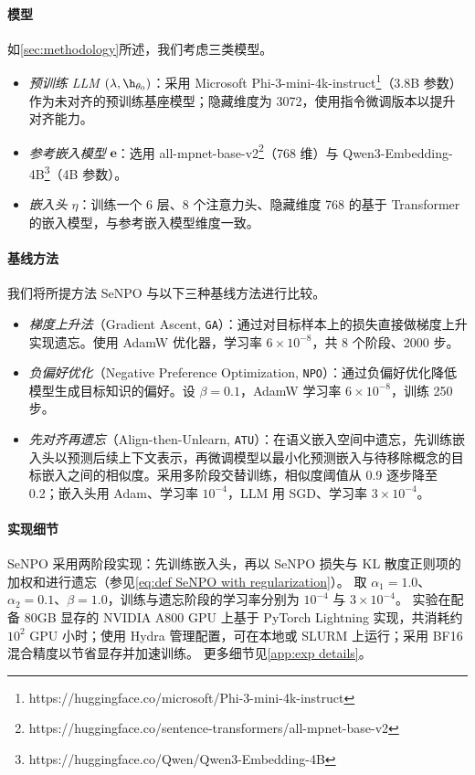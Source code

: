 \paragraph{模型}
如\ref{sec:methodology}所述，我们考虑三类模型。
\begin{itemize}
    \item \textit{预训练 LLM} $(\lambda, \h_{\theta_0})$：采用 Microsoft Phi-3-mini-4k-instruct\footnote{https://huggingface.co/microsoft/Phi-3-mini-4k-instruct}（3.8B 参数）作为未对齐的预训练基座模型；隐藏维度为 3072，使用指令微调版本以提升对齐能力。
    \item \textit{参考嵌入模型} $\boldsymbol{e}$：选用 all-mpnet-base-v2\footnote{https://huggingface.co/sentence-transformers/all-mpnet-base-v2}（768 维）与 Qwen3-Embedding-4B\footnote{https://huggingface.co/Qwen/Qwen3-Embedding-4B}（4B 参数）。
    \item \textit{嵌入头} $\eta$：训练一个 6 层、8 个注意力头、隐藏维度 768 的基于 Transformer 的嵌入模型，与参考嵌入模型维度一致。
\end{itemize}

\paragraph{基线方法}
我们将所提方法 SeNPO 与以下三种基线方法进行比较。
\begin{itemize}
    \item \textit{梯度上升法}（Gradient Ascent, \texttt{GA}）：通过对目标样本上的损失直接做梯度上升实现遗忘。使用 AdamW 优化器，学习率 $6 \times 10^{-8}$，共 8 个阶段、2000 步。
    \item \textit{负偏好优化}（Negative Preference Optimization, \texttt{NPO}）：通过负偏好优化降低模型生成目标知识的偏好。设 $\beta = 0.1$，AdamW 学习率 $6 \times 10^{-8}$，训练 250 步。
    \item \textit{先对齐再遗忘}（Align-then-Unlearn, \texttt{ATU}）：在语义嵌入空间中遗忘，先训练嵌入头以预测后续上下文表示，再微调模型以最小化预测嵌入与待移除概念的目标嵌入之间的相似度。采用多阶段交替训练，相似度阈值从 0.9 逐步降至 0.2；嵌入头用 Adam、学习率 $10^{-4}$，LLM 用 SGD、学习率 $3 \times 10^{-4}$。
\end{itemize}

\paragraph{实现细节}
SeNPO 采用两阶段实现：先训练嵌入头，再以 SeNPO 损失与 KL 散度正则项的加权和进行遗忘（参见\ref{eq:def SeNPO with regularization}）。
取 $\alpha_1 = 1.0$、$\alpha_2=0.1$、$\beta = 1.0$，训练与遗忘阶段的学习率分别为 $10^{-4}$ 与 $3 \times 10^{-4}$。
实验在配备 80GB 显存的 NVIDIA A800 GPU 上基于 PyTorch Lightning 实现，共消耗约 $10^{2}$ GPU 小时；使用 Hydra 管理配置，可在本地或 SLURM 上运行；采用 BF16 混合精度以节省显存并加速训练。
更多细节见\ref{app:exp details}。

